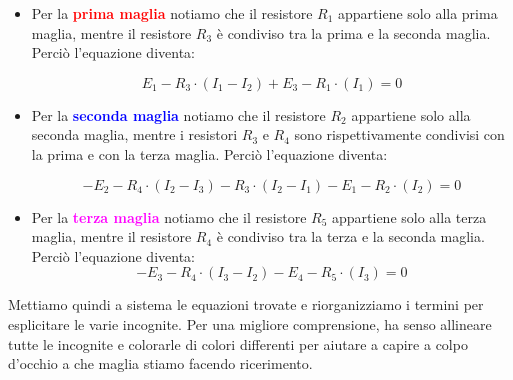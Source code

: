 \begin{itemize}
    \item Per la \textcolor{red}{\textbf{prima maglia}} notiamo che il resistore $R_1$ appartiene solo alla prima maglia, mentre il resistore $R_3$ è condiviso tra la prima e la seconda maglia. Perciò l'equazione diventa:

          \begin{equation}
              E_1 - R_3\cdot \left(I_1 - I_2\right) + E_3 - R_1\cdot \left(I_1\right) = 0
              \label{eq: prima_maglia_Ohm}
          \end{equation}

    \item Per la \textcolor{blue}{\textbf{seconda maglia}} notiamo che il resistore $R_2$ appartiene solo alla seconda maglia, mentre i resistori $R_3$ e $R_4$ sono rispettivamente condivisi con la prima e con la terza maglia. Perciò l'equazione diventa:

          \begin{equation}
              - E_2 - R_4 \cdot \left(I_2 - I_3\right) - R_3 \cdot \left(I_2 - I_1\right) - E_1 - R_2 \cdot \left(I_2 \right) = 0
              \label{eq: seconda_maglia_Ohm}
          \end{equation}


    \item Per la \textcolor{magenta}{\textbf{terza maglia}} notiamo che il resistore $R_5$ appartiene solo alla terza maglia, mentre il resistore $R_4$ è condiviso tra la terza e la seconda maglia. Perciò l'equazione diventa:
          \begin{equation}
              - E_3 - R_4\cdot\left( I_3 - I_2 \right) - E_4 - R_5\cdot \left( I_3 \right) = 0
              \label{eq: terza_maglia_Ohm}
          \end{equation}
\end{itemize}

Mettiamo quindi a sistema le equazioni trovate e riorganizziamo i termini per esplicitare le varie incognite. Per una migliore comprensione, ha senso allineare tutte le incognite e colorarle di colori differenti per aiutare a capire a colpo d'occhio a che maglia stiamo facendo ricerimento.\\

